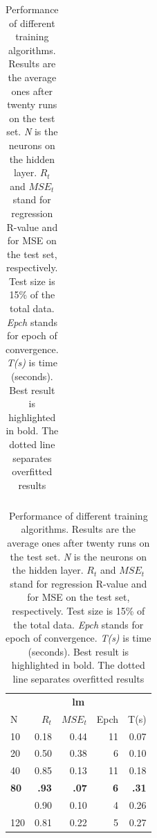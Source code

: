 \documentclass[a4paper, 10pt]{article}
\begin{document}
\begin{table}[h!]
\begin{tabular}{@{}lrrrr@{}}
      \bottomrule
    \end{tabular} 
    \hfill
    \begin{tabular}{@{}lrrrr@{}}
      \toprule
      \multicolumn{5}{c}{\textbf{lm}} \\
      N  &   $R_t$  &  $MSE_t$ &  Epch  & T(s)\\
      \midrule
      10  & 0.18    & 0.44   & 11       & 0.07  \\ 
      20  & 0.50    & 0.38   &  6       & 0.10  \\ 
      40  & 0.85    & 0.13   & 11       & 0.18  \\ 
      \textbf{80} & \textbf{.93} & \textbf{.07}  & \textbf{6} & \textbf{.31} \\
      \hdashline
     100  & 0.90    & 0.10   & 4        & 0.26  \\
     120  & 0.81    & 0.22   & 5        & 0.27  \\  
      \bottomrule
    \end{tabular} \mbox{}
    \caption{Performance of different training algorithms. Results are the
      average ones after twenty runs on the test set. \emph{N} is the
      neurons on the hidden layer. $R_t$ and $MSE_t$ 
    stand for regression R-value and for MSE on the test set, respectively. 
    Test size is 15\% of the total data. \emph{Epch} stands for epoch of 
    convergence. \emph{T(s)} is time (seconds). Best result is 
    highlighted in bold. The dotted line separates overfitted results}
    \label{tab:train_algs}
  \end{table}
\end{document}
